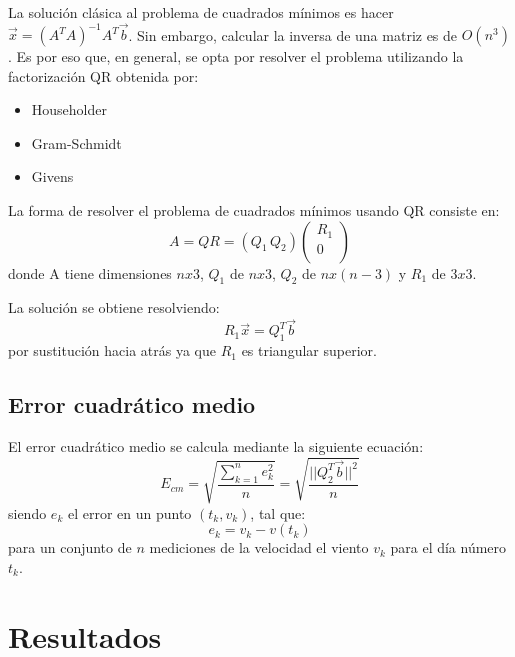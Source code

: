 \documentclass[journal, monochrome]{IEEEtran}
\begin{document}
\par
La solución clásica al problema de cuadrados mínimos es hacer $\vec{x} = (A^{T}A)^{-1}A^{T}\vec{b}$. Sin embargo, calcular la inversa de una matriz es de $O(n^{3})$. Es por eso que, en general, se opta por resolver el problema utilizando la factorización QR obtenida por:
\begin{itemize}
\item Householder
\item Gram-Schmidt
\item Givens
\end{itemize}
\par
La forma de resolver el problema de cuadrados mínimos usando QR consiste en:
\begin{equation}
A = QR = (Q_{1} \, Q_{2}) \left( \begin{array}{c}
R_{1} \\
0 \\
\end{array} \right)
\end{equation}
donde A tiene dimensiones $nx3$, $Q_{1}$ de $nx3$, $Q_{2}$ de $nx(n-3)$ y $R_{1}$ de $3x3$.
\par
La solución se obtiene resolviendo:
\begin{equation}
R_{1}\vec{x} = Q_{1}^{T}\vec{b}
\label{equation:ls}
\end{equation}
por sustitución hacia atrás ya que $R_{1}$ es triangular superior.

\vspace{0.5cm}
\subsection{Error cuadrático medio}
\par
El error cuadrático medio se calcula mediante la siguiente ecuación:
\begin{equation}
 E_{cm} = \sqrt{\frac{\sum_{k=1}^n e_k^2}{n}} = \sqrt{\frac{||Q_{2}^{T}\vec{b}||^{2}}{n}}
\end{equation}
siendo $e_k$ el error en un punto $(t_k, v_k)$, tal que:
\begin{equation}
 e_k = v_k - v(t_k)
\end{equation}
para un conjunto de $n$ mediciones de la velocidad el viento $v_k$ para el día número $t_k$.\\

\vspace{1cm}
\section{Resultados }
\label{section:results}
\vspace{0.5cm}
\end{document}

